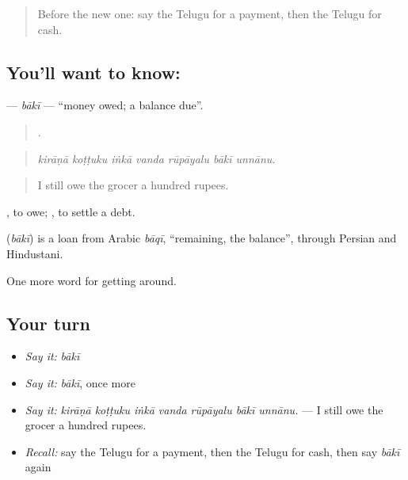 \begin{quote}
Before the new one: say the Telugu for a payment, then the Telugu for cash.
\end{quote}

\subsection*{You'll want to know: }
\textbf{} — \emph{bākī} — \textquotedblleft{}money owed; a balance due\textquotedblright{}.

\begin{quote}
      .
\end{quote}

\begin{quote}
\emph{kirāṇā koṭṭuku iṅkā vanda rūpāyalu bākī unnānu.}
\end{quote}

\begin{quote}
I still owe the grocer a hundred rupees.
\end{quote}

 , to owe;  , to settle a debt.

\begin{cousinweb}
\textbf{} (\emph{bākī}) is a loan from Arabic \emph{bāqī}, \textquotedblleft{}remaining, the balance\textquotedblright{}, through Persian and Hindustani.
\end{cousinweb}

\begin{grammarlens}[title={What you've built}]
One more word for getting around.
\end{grammarlens}

\subsection*{Your turn}
\begin{itemize}
\raggedright
  \item \emph{Say it:} \emph{bākī}
  \item \emph{Say it:} \emph{bākī}, once more
  \item \emph{Say it:} \emph{kirāṇā koṭṭuku iṅkā vanda rūpāyalu bākī unnānu.} — I still owe the grocer a hundred rupees.
  \item \emph{Recall:} say the Telugu for a payment, then the Telugu for cash, then say \emph{bākī} again
\end{itemize}

